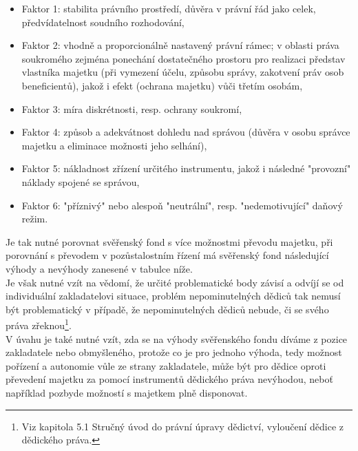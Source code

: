 \documentclass{article}
\begin{document}
\begin{itemize}
	\item Faktor 1: stabilita právního prostředí, důvěra v právní řád jako celek, předvídatelnost soudního rozhodování,
	\item Faktor 2: vhodně a proporcionálně nastavený právní rámec; v oblasti práva soukromého zejména ponechání dostatečného prostoru pro realizaci představ vlastníka majetku (při vymezení účelu, způsobu správy, zakotvení práv osob beneficientů), jakož i efekt (ochrana majetku) vůči třetím osobám,
	\item Faktor 3: míra diskrétnosti, resp. ochrany soukromí,
	\item Faktor 4: způsob a adekvátnost dohledu nad správou (důvěra v osobu správce majetku a eliminace možnosti jeho selhání),
	\item Faktor 5: nákladnost zřízení určitého instrumentu, jakož i následné "provozní" náklady spojené se správou,
	\item Faktor 6: "příznivý" nebo alespoň "neutrální", resp. "nedemotivující" daňový režim.
\end{itemize}




\newpage

Je tak nutné porovnat svěřenský fond s více možnostmi převodu majetku, při porovnání s převodem v pozůstalostním řízení má svěřenský fond následující výhody a nevýhody zanesené v tabulce níže.\\

Je však nutné vzít na vědomí, že určité problematické body závisí a odvíjí se od individuální zakladatelovi situace, problém nepominutelných dědiců tak nemusí být problematický v případě, že nepominutelných dědiců nebude, či se svého práva zřeknou\footnote{Viz kapitola 5.1 Stručný úvod do právní úpravy dědictví, vyloučení dědice z dědického práva.}.\\

V úvahu je také nutné vzít, zda se na výhody svěřenského fondu díváme z pozice zakladatele nebo obmyšleného, protože co je pro jednoho výhoda, tedy možnost pořízení a autonomie vůle ze strany zakladatele, může být pro dědice oproti převedení majetku za pomocí instrumentů dědického práva nevýhodou, neboť například pozbyde možností s majetkem plně disponovat. \\
\end{document}
